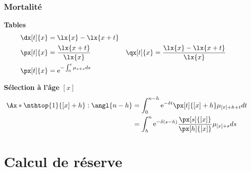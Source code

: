 \documentclass[10pt, french]{article}
\begin{document}
\begin{multicols*}{2}
\subsubsection*{Mortalité}
\textbf{Tables}
\begin{align*}
	\dx[t]{x}
	&=	\lx{x} - \lx{x + t}	\\
	\px[t]{x}
	&=	\frac{\lx{x + t}}{\lx{x}}	&
	\qx[t]{x}
	&=	\frac{\lx{x} - \lx{x + t}}{\lx{x}}	\\
	\px[t]{x}
	&=	\textrm{e}^{-\int_{0}^{t} \mu_{x + s} ds}
\end{align*}


\textbf{Sélection à l'âge $[x]$}
\begin{align*}
	\Ax*{\nthtop{1}{[x] + h}:\angl{n - h}}
	&=	\int_{0}^{n - h} \textrm{e}^{-\delta t} \px[t]{[x] + h} \mu_{[x] + h + t} dt	\\
	&=	\int_{h}^{n} \textrm{e}^{-\delta (s - h)} \frac{\px[s]{[x]}}{\px[h]{[x]}} \mu_{[x] + s} ds
\end{align*}
\pagebreak

\section{Calcul de réserve}


\end{multicols*}
\end{document}

